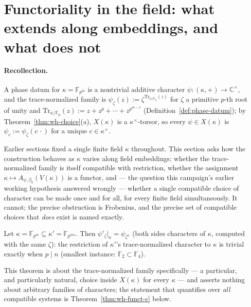 \section{Functoriality in the field: what extends along embeddings, and what
does not}
\label{sec:functoriality}

\paragraph{Recollection.} A phase datum for $\kappa=\mathbb{F}_{p^m}$ is a
nontrivial additive character $\psi:(\kappa,+)\to\mathbb{C}^\times$, and the
trace-normalized family is
$\psi_\zeta(z) := \zeta^{\mathrm{Tr}_{\kappa/\mathbb{F}_p}(z)}$ for $\zeta$ a
primitive $p$-th root of unity and
$\mathrm{Tr}_{\kappa/\mathbb{F}_p}(z):=z+z^p+\cdots+z^{p^{m-1}}$
(Definition~\ref{def:phase-datum}); by Theorem~\ref{thm:wh-choice}(a),
$X(\kappa)$ is a $\kappa^\times$-torsor, so every $\psi\in X(\kappa)$ is
$\psi_c := \psi_\zeta(c\,\cdot)$ for a unique $c\in\kappa^\times$.

Earlier sections fixed a single finite field $\kappa$ throughout. This
section asks how the construction behaves as $\kappa$ varies along field
embeddings: whether the trace-normalized family is itself compatible with
restriction, whether the assignment $\kappa\mapsto A_{\psi,\beta_0}(V(\kappa))$
is a functor, and — the question this campaign's earlier working hypothesis
answered wrongly — whether a single compatible choice of character can be
made once and for all, for every finite field simultaneously. It cannot; the
precise obstruction is Frobenius, and the precise set of compatible choices
that \emph{does} exist is named exactly.

\statusProved
\begin{theorem}
\label{thm:wh-funct-a}
Let $\kappa=\mathbb{F}_{p^m}\subseteq\kappa'=\mathbb{F}_{p^{mn}}$. Then
$\psi'_\zeta|_\kappa = \psi_{\zeta^n}$ (both sides characters of $\kappa$,
computed with the same $\zeta$): the restriction of $\kappa'$'s
trace-normalized character to $\kappa$ is trivial exactly when $p\mid n$
(smallest instance: $\mathbb{F}_2\subset\mathbb{F}_4$).
\end{theorem}

\begin{scope}
This theorem is about the trace-normalized family specifically — a
particular, and particularly natural, choice inside $X(\kappa)$ for every
$\kappa$ — and asserts nothing about arbitrary families of characters; the
statement that quantifies over \emph{all} compatible systems is
Theorem~\ref{thm:wh-funct-c} below.
\end{scope}

